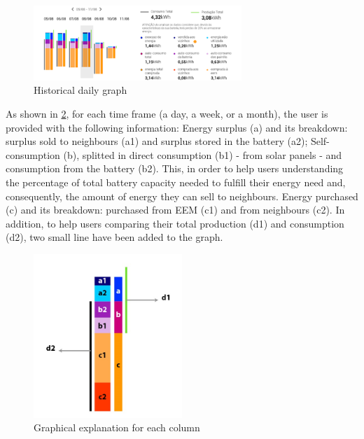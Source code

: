 \begin{figure}[h]
\centering
\includegraphics[width=0.7\textwidth]{./Images/ps6}
\caption{Historical daily graph}
\label{fig:ps6}
\end{figure}


As shown in \cref{fig:ps7}, for each time frame (a day, a week, or a month), the user is provided with the following information:
Energy surplus (a) and its breakdown: surplus sold to neighbours (a1) and surplus stored in the battery (a2);
Self-consumption (b), splitted in direct consumption (b1) - from solar panels - and consumption from the battery (b2). This, in order to help users understanding the percentage of total battery capacity needed to fulfill their energy need and, consequently, the amount of energy they can sell to neighbours.
Energy purchased (c) and its breakdown: purchased from \ac{EEM} (c1) and from neighbours (c2).
In addition, to help users comparing their total production (d1) and consumption (d2), two small line have been added to the graph.

\begin{figure}[h]
\centering
\includegraphics[width=0.5\textwidth]{./Images/ps7}
\caption{Graphical explanation for each column}
\label{fig:ps7}
\end{figure}


